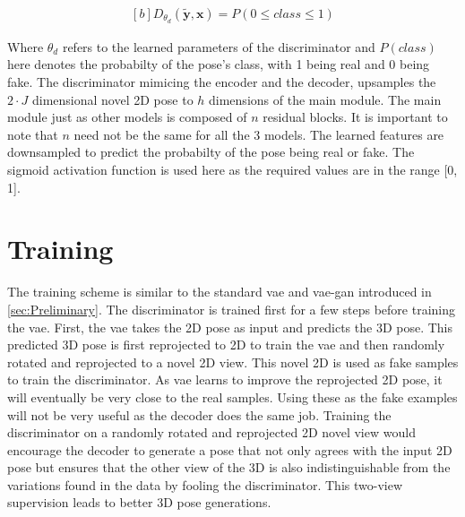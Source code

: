 \begin{equation} \label{eqn:proj_rotated}
    \begin{gathered}[b]
        D_{\theta_d}(\tilde{\textbf{y}}, \textbf{x}) = P(0\leq class \leq 1)
    \end{gathered}
\end{equation}

Where $\theta_d$ refers to the learned parameters of the discriminator and $P(class)$ here denotes the probabilty of the pose's class, with 1 being real and 0 being fake. The discriminator mimicing the encoder and the decoder, upsamples the $2\!\cdot\!J$ dimensional novel 2D pose to $h$ dimensions of the main module. The main module just as other models is composed of $n$ residual blocks. It is important to note that $n$ need not be the same for all the 3 models. The learned features are downsampled to predict the probabilty of the pose being real or fake. The sigmoid activation function is used here as the required values are in the range [0, 1]. %


\section{Training}


The training scheme is similar to the standard \ac{vae} and \ac{vae}-\ac{gan} introduced in \ref{sec:Preliminary}. The discriminator is trained first for a few steps before training the \ac{vae}. First, the \ac{vae} takes the 2D pose as input and predicts the 3D pose. This predicted 3D pose is first reprojected to 2D to train the \ac{vae} and then randomly rotated and reprojected to a novel 2D view. This novel 2D is used as fake samples to train the discriminator. As \ac{vae} learns to improve the reprojected 2D pose, it will eventually be very close to the real samples. Using these as the fake examples will not be very useful as the decoder does the same job. Training the discriminator on a randomly rotated and reprojected 2D novel view would encourage the decoder to generate a pose that not only agrees with the input 2D pose but ensures that the other view of the 3D is also indistinguishable from the variations found in the data by fooling the discriminator. This two-view supervision leads to better 3D pose generations.


